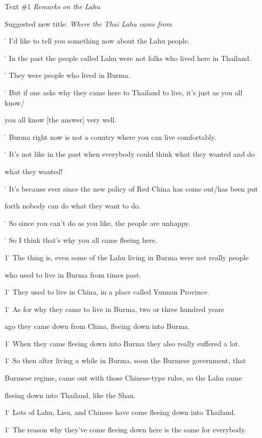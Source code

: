 
{\large{}Text \#1 }{\large{}\textit{Remarks on the Lahu}}

{\large{}Suggested new title:  }{\large{}\textit{Where the Thai Lahu came from}}

\. I'd like to tell you something now about the Lahu people.

\. In the past the people called Lahu were not folks who lived here in Thailand.

\. They were people who lived in Burma.

\. But if one asks why they came here to Thailand to live, it's just as you all
know/

you all know [the answer] very well.

\. Burma right now is not a country where you can live comfortably.

\. It's not like in the past when everybody could think what they wanted and do

what they wanted!

\. It's because ever since the new policy of Red China has come out/has been put

forth nobody can do what they want to do.

\. So since you can't do as you like, the people are unhappy.

\. So I think that's why you all came fleeing here.

1\. The thing is, even some of the Lahu living in Burma were not really people

who used to live in Burma from times past.

1\. They used to live in China, in a place called Yunnan Province.

1\. As for why they came to live in Burma, two or three hundred years

ago they came down from China, fleeing down into Burma.

1\. When they came fleeing down into Burma they also really suffered a lot.

1\. So then after living a while in Burma, soon the Burmese government, that

Burmese regime, came out with those Chinese-type rules, so the Lahu came

fleeing down into Thailand, like the Shan.

1\. Lots of Lahu, Lisu, and Chinese have come fleeing down into Thailand.

1\. The reason why they've come fleeing down here is the same for everybody.


